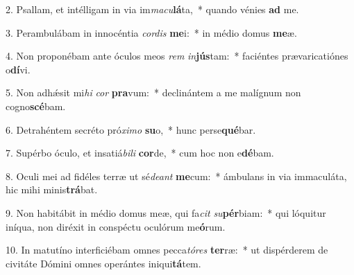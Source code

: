 2. Psallam, et intélligam in via im\textit{ma}\textit{cu}\textbf{lá}ta,~*  quando vénies \textbf{ad} me.\

3. Perambulábam in innocéntia \textit{cor}\textit{dis} \textbf{me}i:~*  in médio domus \textbf{me}æ.\

4. Non proponébam ante óculos meos \textit{rem} \textit{in}\textbf{jús}tam:~*  faciéntes prævaricatiónes o\textbf{dí}vi.\

5. Non adhǽsit mi\textit{hi} \textit{cor} \textbf{pra}vum:~*  declinántem a me malígnum non cogno\textbf{scé}bam.\

6. Detrahéntem secréto pró\textit{xi}\textit{mo} \textbf{su}o,~*  hunc perse\textbf{qué}bar.\

7. Supérbo óculo, et insatiá\textit{bi}\textit{li} \textbf{cor}de,~*  cum hoc non e\textbf{dé}bam.\

8. Oculi mei ad fidéles terræ ut sé\textit{de}\textit{ant} \textbf{me}cum:~*  ámbulans in via immaculáta, hic mihi minis\textbf{trá}bat.\

9. Non habitábit in médio domus meæ, qui fa\textit{cit} \textit{su}\textbf{pér}biam:~*  qui lóquitur iníqua, non diréxit in conspéctu oculórum me\textbf{ó}rum.\

10. In matutíno interficiébam omnes pecca\textit{tó}\textit{res} \textbf{ter}ræ:~*  ut dispérderem de civitáte Dómini omnes operántes iniqui\textbf{tá}tem.\

